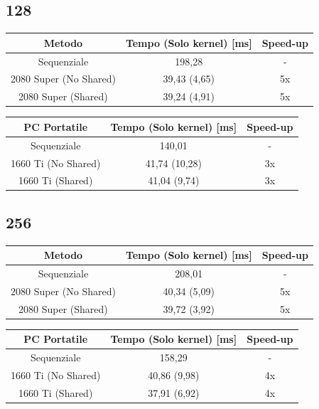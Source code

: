 \documentclass[12pt,a4paper]{report}
\begin{document}
			\subsection{128}
			
				\begin{tabular}{|c|c|c|}
					\hline
					Metodo & Tempo (Solo kernel) [ms] & Speed-up \\
					\hline
					Sequenziale & 198,28 & -  \\
					\hline
					2080 Super (No Shared) & 39,43 (4,65) & 5x \\
					\hline
					2080 Super (Shared) & 39,24 (4,91) & 5x \\
					\hline
				\end{tabular}
				
				\bigbreak
				
				\begin{tabular}{|c|c|c|}
					\hline
					PC Portatile & Tempo (Solo kernel) [ms] & Speed-up \\
					\hline
					Sequenziale & 140,01 & -  \\
					\hline
					1660 Ti (No Shared) & 41,74 (10,28) & 3x \\
					\hline
					1660 Ti (Shared) & 41,04 (9,74) & 3x \\
					\hline
				\end{tabular}

			\subsection{256}
			
				\begin{tabular}{|c|c|c|}
					\hline
					Metodo & Tempo (Solo kernel) [ms] & Speed-up \\
					\hline
					Sequenziale & 208,01 & -  \\
					\hline
					2080 Super (No Shared) & 40,34 (5,09) & 5x \\
					\hline
					2080 Super (Shared) & 39,72 (3,92) & 5x \\
					\hline
				\end{tabular}
				
				\bigbreak
				
				\begin{tabular}{|c|c|c|}
					\hline
					PC Portatile & Tempo (Solo kernel) [ms] & Speed-up \\
					\hline
					Sequenziale & 158,29 & -  \\
					\hline
					1660 Ti (No Shared) & 40,86 (9,98) & 4x \\
					\hline
					1660 Ti (Shared) & 37,91 (6,92) & 4x \\
					\hline
				\end{tabular}
			
\end{document}
